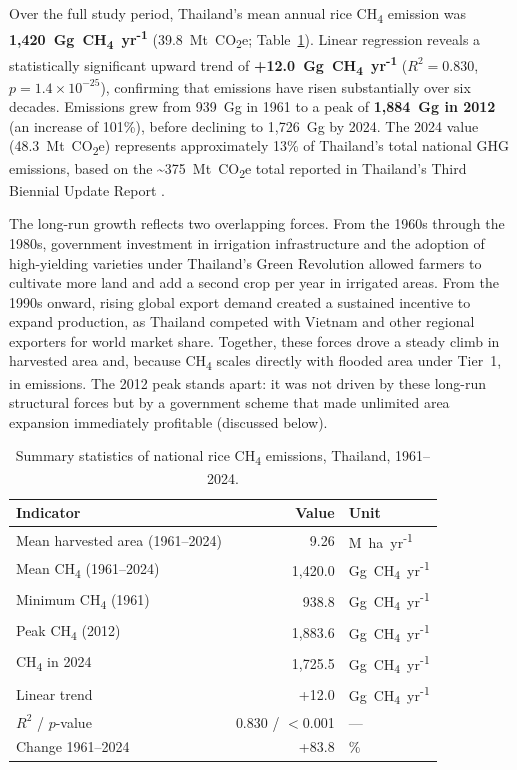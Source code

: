 \documentclass[fleqn,10pt]{olplainarticle}
\begin{document}
Over the full study period, Thailand's mean annual rice CH\textsubscript{4}
emission was \textbf{1,420~Gg~CH\textsubscript{4}~yr\textsuperscript{-1}}
(39.8~Mt~CO\textsubscript{2}e; Table~\ref{tab:national}).
Linear regression reveals a statistically significant upward trend of
\textbf{+12.0~Gg~CH\textsubscript{4}~yr\textsuperscript{-1}}
($R^2 = 0.830$, $p = 1.4 \times 10^{-25}$), confirming that emissions
have risen substantially over six decades.
Emissions grew from 939~Gg in 1961 to a peak of \textbf{1,884~Gg in 2012}
(an increase of 101\%), before declining to 1,726~Gg by 2024.
The 2024 value (48.3~Mt~CO\textsubscript{2}e) represents approximately 13\%
of Thailand's total national GHG emissions, based on the \textasciitilde{}375~Mt~CO\textsubscript{2}e
total reported in Thailand's Third Biennial Update Report \citep{tgo2022}.

The long-run growth reflects two overlapping forces.
From the 1960s through the 1980s, government investment in irrigation
infrastructure and the adoption of high-yielding varieties under Thailand's
Green Revolution allowed farmers to cultivate more land and add a second crop
per year in irrigated areas.
From the 1990s onward, rising global export demand created a sustained
incentive to expand production, as Thailand competed with Vietnam and other
regional exporters for world market share.
Together, these forces drove a steady climb in harvested area and, because
CH\textsubscript{4} scales directly with flooded area under Tier~1, in
emissions.
The 2012 peak stands apart: it was not driven by these long-run structural
forces but by a government scheme that made unlimited area expansion
immediately profitable (discussed below).

\begin{table}[!htbp]
\centering
\caption{Summary statistics of national rice CH\textsubscript{4} emissions,
         Thailand, 1961--2024.}
\label{tab:national}
\begin{tabular}{@{}lrl@{}}
\toprule
\textbf{Indicator} & \textbf{Value} & \textbf{Unit} \\
\midrule
Mean harvested area (1961--2024)         & 9.26    & M~ha~yr\textsuperscript{-1} \\
Mean CH\textsubscript{4} (1961--2024)    & 1,420.0 & Gg~CH\textsubscript{4}~yr\textsuperscript{-1} \\
Minimum CH\textsubscript{4} (1961)       & 938.8   & Gg~CH\textsubscript{4}~yr\textsuperscript{-1} \\
Peak CH\textsubscript{4} (2012)          & 1,883.6 & Gg~CH\textsubscript{4}~yr\textsuperscript{-1} \\
CH\textsubscript{4} in 2024              & 1,725.5 & Gg~CH\textsubscript{4}~yr\textsuperscript{-1} \\
Linear trend                             & +12.0   & Gg~CH\textsubscript{4}~yr\textsuperscript{-1} \\
$R^2$ / $p$-value                        & 0.830 / $<$0.001 & --- \\
Change 1961--2024                        & +83.8   & \% \\
\bottomrule
\end{tabular}
\end{table}
\end{document}
